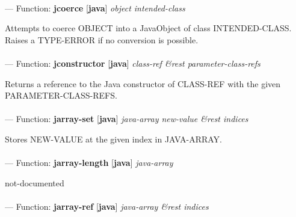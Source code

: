 \paragraph{}
\label{JAVA:JCOERCE}
--- Function: \textbf{jcoerce} [\textbf{java}] \textit{object intended-class}

\begin{adjustwidth}{5em}{5em}
Attempts to coerce OBJECT into a JavaObject of class INTENDED-CLASS.  Raises a TYPE-ERROR if no conversion is possible.
\end{adjustwidth}

\paragraph{}
\label{JAVA:JCONSTRUCTOR}
--- Function: \textbf{jconstructor} [\textbf{java}] \textit{class-ref \&rest parameter-class-refs}

\begin{adjustwidth}{5em}{5em}
Returns a reference to the Java constructor of CLASS-REF with the given PARAMETER-CLASS-REFS.
\end{adjustwidth}

\paragraph{}
\label{JAVA:JARRAY-SET}
--- Function: \textbf{jarray-set} [\textbf{java}] \textit{java-array new-value \&rest indices}

\begin{adjustwidth}{5em}{5em}
Stores NEW-VALUE at the given index in JAVA-ARRAY.
\end{adjustwidth}

\paragraph{}
\label{JAVA:JARRAY-LENGTH}
--- Function: \textbf{jarray-length} [\textbf{java}] \textit{java-array}

\begin{adjustwidth}{5em}{5em}
not-documented
\end{adjustwidth}

\paragraph{}
\label{JAVA:JARRAY-REF}
--- Function: \textbf{jarray-ref} [\textbf{java}] \textit{java-array \&rest indices}

